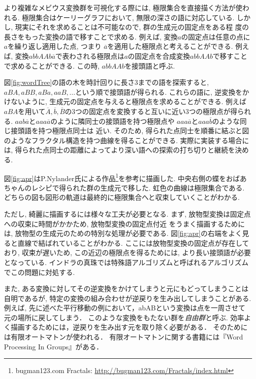 より複雑なメビウス変換群を可視化する際には, 極限集合を直接描く方法が使わ
れる.
極限集合はケーリーグラフにおいて, 無限の深さの語に対応している.
しかし, 現実にそれを求めることは不可能なので, 群の生成元の固定点をある程
度の長さをもった変換の語で移すことで求める.
例えば, 変換$a$の固定点は任意の点に$a$を繰り返し適用した点, つまり
$\overline{a}$を適用した極限点と考えることができる.
例えば, 変換$abbAAb\overline{a}$で表わされる極限点は$a$の固定点を合成変換$abbAAb$で移すことで求めることができる.
この時, $abbAAb$を接頭語と呼ぶ.

図\ref{fig:wordTree}の語の木を時計回りに長さ3までの語を探索すると,$ aBA, aBB, aBa, aaB, ...$という順で接頭語が得られる.
これらの語に, 逆変換をかけないように, 生成元の固定点を与えると極限点を求めることができる.
例えば$aBA$を用いて$\overline{A}, \overline{b}, \overline{B}$の3つの固定点を変換すると互いに近い3つの極限点が得られる.
$aab\overline{a}$と$aaa\overline{a}$のように隣同士の接頭語を持つ極限点や
$aaa\overline{a}$と$aaa\overline{b}$のような同じ接頭語を持つ極限点同士は
近い.
そのため, 得られた点同士を順番に結ぶと図のようなフラクタル構造を持つ曲線を得ることができる.
実際に実装する場合には, 得られた点同士の距離によってより深い語への探索の打ち切りと継続を決める.

図\ref{fig:apr}はP.Nylander氏による作品\footnote{bugman123.com Fractals:
\url{http://bugman123.com/Fractals/index.html}}を参考に描画した.
中央右側の蝶をおばあちゃんのレシピで得られた群の生成元で移した.
虹色の曲線は極限集合である.
どちらの図も図形の軌道は最終的に極限集合へと収束していくことがわかる.

ただし, 綺麗に描画するには様々な工夫が必要となる.
まず, 放物型変換は固定点への収束に時間がかかため, 放物型変換の固定点付近
をうまく描画するためには, 放物型の生成元のための特別な処理が必要である.
図\ref{fig:apr}の右端をよく見ると直線で結ばれていることがわかる.
ここには放物型変換の固定点が存在しており, 収束が遅いため, この近辺の極限点を得るためには, より長い接頭語が必要となっている.
インドラの真珠では特殊語アルゴリズムと呼ばれるアルゴリズムでこの問題に対処する.

また, ある変換に対してその逆変換をかけてしまうと元にもどってしまうことは
自明であるが, 特定の変換の組み合わせが逆戻りを生み出してしまうことがある.
例えば, 先に述べた平行移動の例において，abABという変換は点を一周させて元の場所に戻してしまう．
このような変換をもたない群を\emph{自由群}と呼ぶ.
効率よく描画するためには，逆戻りを生み出す元を取り除く必要がある．
そのためには有限オートマトンが使われる．
有限オートマトンに関する書籍には『Word Processing In Groups』\cite{wordProcessing}がある．

